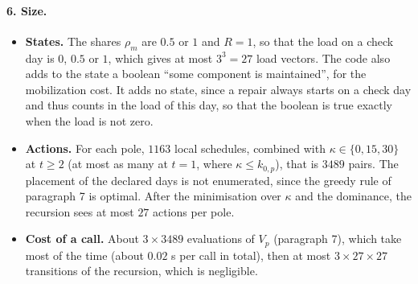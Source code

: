 \documentclass[11pt]{article}
\begin{document}
\paragraph{6. Size.}
\begin{itemize}
  \item \textbf{States.} The shares $\rho_m$ are $0.5$ or $1$ and $R = 1$, so that the load on a check
        day is $0$, $0.5$ or $1$, which gives at most $3^3 = 27$ load vectors. The code also adds to
        the state a boolean ``some component is maintained'', for the mobilization cost. It adds no
        state, since a repair always starts on a check day and thus counts in the load of this day,
        so that the boolean is true exactly when the load is not zero.
  \item \textbf{Actions.} For each pole, $1163$ local schedules, combined with $\kappa \in \{0, 15,
        30\}$ at $t \ge 2$ (at most as many at $t = 1$, where $\kappa \le k_{0,p}$), that is $3489$
        pairs. The placement of the declared days is not enumerated, since the greedy rule of
        paragraph 7 is optimal. After the minimisation over $\kappa$ and the dominance, the recursion
        sees at most $27$ actions per pole.
  \item \textbf{Cost of a call.} About $3 \times 3489$ evaluations of $V_p$ (paragraph 7), which take
        most of the time (about $0.02$ s per call in total), then at most $3 \times 27 \times 27$
        transitions of the recursion, which is negligible.
\end{itemize}
\end{document}
